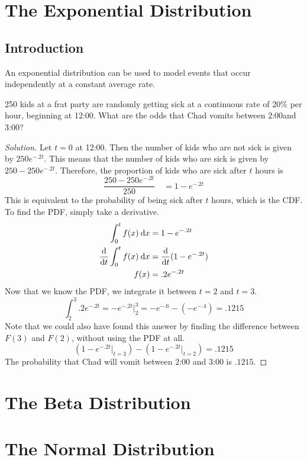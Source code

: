 \documentclass[11pt,leqno,letterpaper]{article}
\begin{document}
\section{The Exponential Distribution}
\subsection{Introduction}
An exponential distribution can be used to model events that occur
independently at a constant average rate.\\
\psep
\begin{problem}
250 kids at a frat party are randomly getting sick at a continuous
rate of 20\% per hour, beginning at 12:00\AM .
What are the odds that Chad vomits between 2:00\AM{ }and 3:00\AM ?
\begin{proof}[Solution]
Let $t=0$ at 12:00\AM .
Then the number of kids who are not sick is given by $250e^{-.2t}$.
This means that the number of kids who are sick is given by
$250 - 250e^{-.2t}$.
Therefore, the proportion of kids who are sick after $t$ hours is
\[
\frac{250 - 250e^{-.2t}}{250} \quad = 1 - e^{-.2t}
\]
This is equivalent to the probability of being sick after $t$ hours,
which is the CDF. To find the PDF, simply take a derivative.
\begin{align*}
\int_0^t f(x) \:\mathrm{d}x &= 1 - e^{-.2t}\\
\frac{\mathrm{d}}{\mathrm{d}t} \int_0^t f(x) \:\mathrm{d}x &= \frac{\mathrm{d}}{\mathrm{d}t} (1 - e^{-.2t})\\
f(x) &= .2e^{-.2t}
\end{align*}
Now that we know the PDF, we integrate it between $t=2$ and $t=3$.
\[
\int_2^3 .2e^{-.2t} = -e^{-.2t}\Big|_2^3 = -e^{-.6} - (-e^{-.4})
= .1215
\]
Note that we could also have found this answer by
finding the difference between $F(3)$ and $F(2)$,
without using the PDF at all.
\[
\left(1 - e^{-.2t}\Big|_{t=3}\right) -
\left(1 - e^{-.2t}\Big|_{t=2}\right) = .1215
\]
The probability that Chad will vomit between 2:00\AM{} and 3:00\AM{}
is $.1215$.
\end{proof}
\end{problem}
\psep
\section{The Beta Distribution}
\section{The Normal Distribution}
\end{document}
